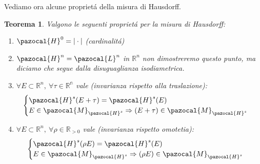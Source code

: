 \documentclass[11pt,a4paper]{report}
\theoremstyle{plain}
\newtheorem{thm}{Teorema}[chapter] %
\theoremstyle{definition}
\newcommand{\Hu}{\pazocal{H}}
\newcommand{\Le}{\pazocal{L}}
\newcommand{\Mh}{\pazocal{M}_{\Hu^s}}
\begin{document}
Vediamo ora alcune propriet\'a della misura di Hausdorff.
\begin{thm}
	Valgono le seguenti propriet\'a per la misura di Hausdorff:
	\begin{enumerate}
		\item $\Hu^0 = |\cdot|$ (cardinalit\'a)
		\item $\Hu^n = \Le^n$ in $\mathbb{R}^n$ non dimostreremo questo punto, ma diciamo che segue dalla disuguaglianza isodiametrica.
		\item $\forall E \subset \mathbb{R}^n,\ \forall \tau \in \mathbb{R^n}$ vale (invarianza rispetto alla traslazione):
		\[
			\begin{cases}
				\Hu^s(E + \tau) = \Hu^s(E) \\
				 E \in \Mh \Rightarrow (E + \tau) \in \Mh
			\end{cases}		
		\]
		\item $\forall E \subset \mathbb{R}^n,\ \forall \rho \in \mathbb{R}_{>0}$ vale (invarianza rispetto omotetia):
		\[
			\begin{cases}
				\Hu^s(\rho E) = \Hu^s(E) \\
				E \in \Mh \Rightarrow (\rho E) \in \Mh
			\end{cases}		
		\]
	\end{enumerate}
\end{thm}
\end{document}
